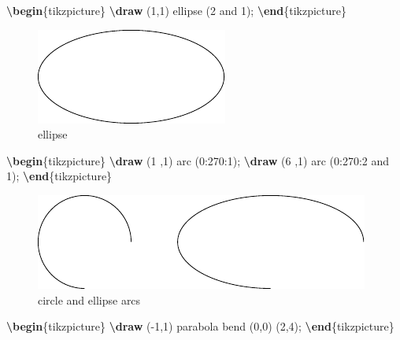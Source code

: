 \documentclass[
]{book}
\newenvironment{Shaded}{\begin{snugshade}}{\end{snugshade}}
\newcommand{\ExtensionTok}[1]{#1}
\newcommand{\FunctionTok}[1]{\textcolor[rgb]{0.13,0.29,0.53}{\textbf{#1}}}
\newcommand{\KeywordTok}[1]{\textcolor[rgb]{0.13,0.29,0.53}{\textbf{#1}}}
\newcommand{\NormalTok}[1]{#1}
\theoremstyle{definition}
\theoremstyle{definition}
\theoremstyle{definition}
\theoremstyle{definition}
\theoremstyle{remark}
\begin{document}
\begin{Shaded}
\begin{Highlighting}[]
\KeywordTok{\textbackslash{}begin}\NormalTok{\{}\ExtensionTok{tikzpicture}\NormalTok{\}}
  \FunctionTok{\textbackslash{}draw}\NormalTok{ (1,1) ellipse (2 and 1);}
\KeywordTok{\textbackslash{}end}\NormalTok{\{}\ExtensionTok{tikzpicture}\NormalTok{\}}
\end{Highlighting}
\end{Shaded}

\begin{figure}
\includegraphics[width=0.25\linewidth]{202401311000-TikZ_files/figure-latex/unnamed-chunk-28-1} \caption{ellipse}\label{fig:unnamed-chunk-28}
\end{figure}

\begin{Shaded}
\begin{Highlighting}[]
\KeywordTok{\textbackslash{}begin}\NormalTok{\{}\ExtensionTok{tikzpicture}\NormalTok{\}}
  \FunctionTok{\textbackslash{}draw}\NormalTok{ (1 ,1) arc (0:270:1);}
  \FunctionTok{\textbackslash{}draw}\NormalTok{ (6 ,1) arc (0:270:2 and 1);}
\KeywordTok{\textbackslash{}end}\NormalTok{\{}\ExtensionTok{tikzpicture}\NormalTok{\}}
\end{Highlighting}
\end{Shaded}

\begin{figure}
\includegraphics[width=0.25\linewidth]{202401311000-TikZ_files/figure-latex/unnamed-chunk-30-1} \caption{circle and ellipse arcs}\label{fig:unnamed-chunk-30}
\end{figure}

\begin{Shaded}
\begin{Highlighting}[]
\KeywordTok{\textbackslash{}begin}\NormalTok{\{}\ExtensionTok{tikzpicture}\NormalTok{\}}
  \FunctionTok{\textbackslash{}draw}\NormalTok{ ({-}1,1) parabola bend (0,0) (2,4);}
\KeywordTok{\textbackslash{}end}\NormalTok{\{}\ExtensionTok{tikzpicture}\NormalTok{\}}
\end{Highlighting}
\end{Shaded}
\end{document}
